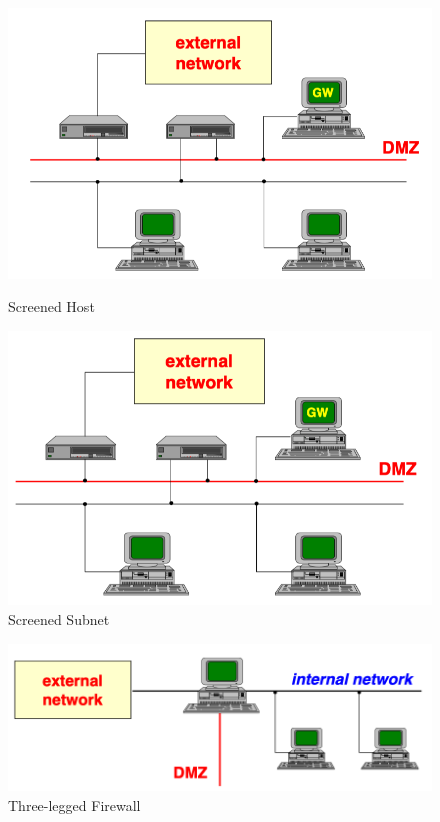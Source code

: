 \documentclass[12pt]{article}
\begin{document}
\begin{figure}[h!]
  \centering
  \begin{minipage}{.48\textwidth}
    \centering
    \includegraphics[width=\linewidth]{images/screened-host.png}
    \caption{Screened Host}
    \label{fig:screened-host}
  \end{minipage}\hfill
  \begin{minipage}{.48\textwidth}
    \centering
    \includegraphics[width=\linewidth]{images/screened-subnet.png}
    \caption{Screened Subnet}
    \label{fig:screened-subnet}
  \end{minipage}\hfill
\end{figure}
\begin{figure}[H]
   \centering
   \includegraphics[width=\linewidth]{images/3leg.png}
   \caption{Three-legged Firewall}
   \label{fig:3leg}
\end{figure}
\end{document}
